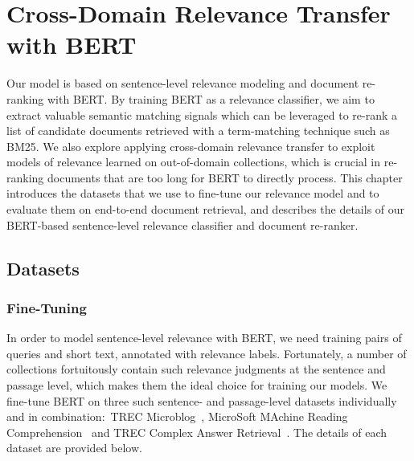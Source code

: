 \chapter{Cross-Domain Relevance Transfer with BERT}
\label{ch:model}


Our model is based on sentence-level relevance modeling and document re-ranking with BERT.
By training BERT as a relevance classifier, we aim to extract valuable semantic matching signals which can be leveraged to re-rank a list of candidate documents retrieved with a term-matching technique such as BM25.
We also explore applying cross-domain relevance transfer to exploit models of relevance learned on out-of-domain collections, which is crucial in re-ranking documents that are too long for BERT to directly process.
This chapter introduces the datasets that we use to fine-tune our relevance model and to evaluate them on end-to-end document retrieval, and describes the details of our BERT-based sentence-level relevance classifier and document re-ranker.

\section{Datasets}

\subsection{Fine-Tuning}

In order to model sentence-level relevance with BERT, we need training pairs of queries and short text, annotated with relevance labels.
Fortunately, a number of collections fortuitously contain such relevance judgments at the sentence and passage level, which makes them the ideal choice for training our models.
We fine-tune BERT on three such sentence- and passage-level datasets individually and in combination:\ TREC Microblog~\cite{ounisoverview}, MicroSoft MAchine Reading Comprehension~\cite{nguyen2016msmarco} and TREC Complex Answer Retrieval~\cite{dietz2017trec}.
The details of each dataset are provided below.


